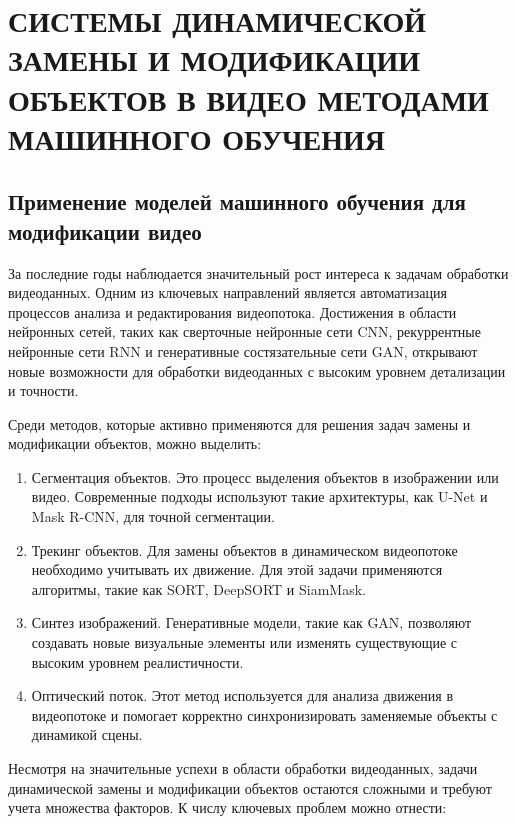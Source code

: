 \newpage
\section{СИСТЕМЫ ДИНАМИЧЕСКОЙ ЗАМЕНЫ И МОДИФИКАЦИИ ОБЪЕКТОВ В ВИДЕО МЕТОДАМИ МАШИННОГО ОБУЧЕНИЯ}
\subsection{Применение моделей машинного обучения для модификации видео}

За последние годы наблюдается значительный рост интереса к задачам обработки видеоданных. Одним из ключевых направлений является автоматизация процессов анализа и редактирования видеопотока. Достижения в области нейронных сетей, таких как сверточные нейронные сети CNN, рекуррентные нейронные сети RNN и генеративные состязательные сети GAN, открывают новые возможности для обработки видеоданных с высоким уровнем детализации и точности.

Среди методов, которые активно применяются для решения задач замены и модификации объектов, можно выделить:

\begin{enumerate}
    \item Сегментация объектов. Это процесс выделения объектов в изображении или видео. Современные подходы используют такие архитектуры, как U-Net и Mask R-CNN, для точной сегментации.

    \item Трекинг объектов. Для замены объектов в динамическом видеопотоке необходимо учитывать их движение. Для этой задачи применяются алгоритмы, такие как SORT, DeepSORT и SiamMask.

    \item Синтез изображений. Генеративные модели, такие как GAN, позволяют создавать новые визуальные элементы или изменять существующие с высоким уровнем реалистичности.

    \item Оптический поток. Этот метод используется для анализа движения в видеопотоке и помогает корректно синхронизировать заменяемые объекты с динамикой сцены.
\end{enumerate}

Несмотря на значительные успехи в области обработки видеоданных, задачи динамической замены и модификации объектов остаются сложными и требуют учета множества факторов. К числу ключевых проблем можно отнести:

